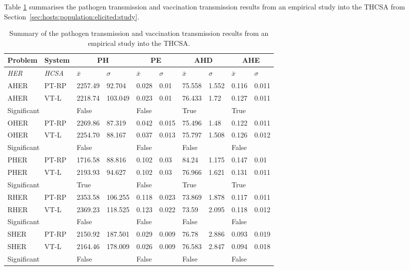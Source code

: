 Table \ref{tab:hosts:thcsa:results:ptvsvt} summarises the pathogen transmission and vaccination transmission results from an empirical study into the THCSA from Section~\ref{sec:hosts:population:elicited:study}.

\begin{table}[H]
	\centering\small
		\begin{tabularx}{\textwidth} {llllllllll}
		\toprule
		\textbf{Problem} & \textbf{System} & \multicolumn{2}{c}{\textbf{PH}} & \multicolumn{2}{c}{\textbf{PE}} & \multicolumn{2}{c}{\textbf{AHD}} &\multicolumn{2}{c}{\textbf{AHE}} \\ 
		\midrule
		\emph{HER} & \emph{HCSA} & $\bar{x}$ & $\sigma$ & $\bar{x}$ & $\sigma$ & $\bar{x}$ & $\sigma$ & $\bar{x}$ & $\sigma$ \\ 
		\toprule
		AHER & PT-RP & 2257.49 & 92.704 & 0.028 & 0.01 & 75.558 & 1.552 & 0.116 & 0.011 \\ 
		AHER & VT-L & 2218.74 & 103.049 & 0.023 & 0.01 & 76.433 & 1.72 & 0.127 & 0.011 \\ 
		\multicolumn{2}{l}{Significant} & False &  & False &  & True &  & True &  \\ 
		\midrule
		OHER & PT-RP & 2269.86 & 87.319 & 0.042 & 0.015 & 75.496 & 1.48 & 0.122 & 0.011 \\ 
		OHER & VT-L & 2254.70 & 88.167 & 0.037 & 0.013 & 75.797 & 1.508 & 0.126 & 0.012 \\ 
		\multicolumn{2}{l}{Significant} & False &  & False & & False & & False & \\ 
		\midrule
		PHER & PT-RP & 1716.58 & 88.816 & 0.102 & 0.03 & 84.24 & 1.175 & 0.147 & 0.01 \\ 
		PHER & VT-L & 2193.93 & 94.627 & 0.102 & 0.03 & 76.966 & 1.621 & 0.131 & 0.011 \\ 
		\multicolumn{2}{l}{Significant} & True & & False & & True & & True & \\ 
		\midrule
		RHER & PT-RP & 2353.58 & 106.255 & 0.118 & 0.023 & 73.869 & 1.878 & 0.117 & 0.011 \\ 
		RHER & VT-L & 2369.23 & 118.525 & 0.123 & 0.022 & 73.59 & 2.095 & 0.118 & 0.012 \\ 
		\multicolumn{2}{l}{Significant} & False & & False & & False & & False & \\ 
		\midrule
		SHER & PT-RP & 2150.92 & 187.501 & 0.029 & 0.009 & 76.78 & 2.886 & 0.093 & 0.019 \\
		SHER & VT-L & 2164.46 & 178.009 & 0.026 & 0.009 & 76.583 & 2.847 & 0.094 & 0.018 \\ 
		\multicolumn{2}{l}{Significant} & False & & False & & False & & False & \\ 
		\bottomrule
		\end{tabularx}	
	\caption{Summary of the pathogen transmission and vaccination transmission results from an empirical study into the THCSA.}
	\label{tab:hosts:thcsa:results:ptvsvt}
\end{table}



